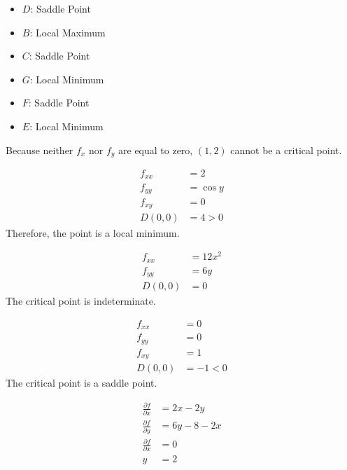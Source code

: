 \documentclass[8pt]{extarticle}
\begin{document}
  \begin{problem}{15.1}
    \begin{description}[font=\normalfont]
      \item[2:]
        \begin{itemize}
          \item $D$: Saddle Point
          \item $B$: Local Maximum
          \item $C$: Saddle Point
          \item $G$: Local Minimum
          \item $F$: Saddle Point
          \item $E$: Local Minimum
        \end{itemize}
      \item[4:] Because neither $f_{x}$ nor $f_{y}$ are equal to zero, $(1,2)$ cannot be a critical point.
      \item[6:]
        \begin{align*}
          f_{xx} &= 2\\
          f_{yy} &= \cos y\\
          f_{xy} &= 0\\
          D(0,0) &= 4 > 0
        \end{align*}
        Therefore, the point is a local minimum.
      \item[8:]
        \begin{align*}
          f_{xx} &= 12x^2\\
          f_{yy} &= 6y\\
          D(0,0) &= 0
        \end{align*}
        The critical point is indeterminate.
      \item[10:]
        \begin{align*}
          f_{xx} &= 0\\
          f_{yy} &= 0\\
          f_{xy} &= 1\\
          D(0,0) &= -1 < 0
        \end{align*}
        The critical point is a saddle point.
      \item[14:]
        \begin{align*}
          \frac{\partial f}{\partial x} &= 2x - 2y\\
          \frac{\partial f}{\partial y} &= 6y - 8 - 2x\\
          \frac{\partial f}{\partial x} &= 0\\
          y &= 2\\

\end{align*}
\end{description}
\end{problem}
\end{document}
